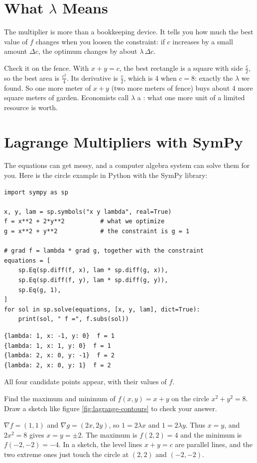 \section{What $\lambda$ Means}
The multiplier is more than a bookkeeping device. It tells you how much the best value
of $f$ changes when you loosen the constraint: if $c$ increases by a small amount
$\Delta c$, the optimum changes by about $\lambda\,\Delta c$.

Check it on the fence. With $x + y = c$, the best rectangle is a square with side
$\frac{c}{2}$, so the best area is $\frac{c^2}{4}$. Its derivative is $\frac{c}{2}$, which is 4
when $c = 8$: exactly the $\lambda$ we found. So one more meter of $x + y$ (two more
meters of fence) buys about 4 more square meters of garden. Economists call $\lambda$ a
: what one more unit of a limited resource is worth.

\section{Lagrange Multipliers with SymPy}
The equations can get messy, and a computer algebra system can solve them for you. Here
is the circle example in Python with the SymPy library:
\begin{verbatim}
import sympy as sp

x, y, lam = sp.symbols("x y lambda", real=True)
f = x**2 + 2*y**2          # what we optimize
g = x**2 + y**2            # the constraint is g = 1

# grad f = lambda * grad g, together with the constraint
equations = [
    sp.Eq(sp.diff(f, x), lam * sp.diff(g, x)),
    sp.Eq(sp.diff(f, y), lam * sp.diff(g, y)),
    sp.Eq(g, 1),
]
for sol in sp.solve(equations, [x, y, lam], dict=True):
    print(sol, " f =", f.subs(sol))
\end{verbatim}
\begin{verbatim}
{lambda: 1, x: -1, y: 0}  f = 1
{lambda: 1, x: 1, y: 0}  f = 1
{lambda: 2, x: 0, y: -1}  f = 2
{lambda: 2, x: 0, y: 1}  f = 2
\end{verbatim}
All four candidate points appear, with their values of $f$.

\begin{Exercise}[title={On a Circle}, label=lm_circle]
Find the maximum and minimum of $f(x, y) = x + y$ on the circle $x^2 + y^2 = 8$. Draw a
sketch like figure \ref{fig:lagrange-contours} to check your answer.
\end{Exercise}
\begin{Answer}[ref=lm_circle]
$\nabla f = (1, 1)$ and $\nabla g = (2x, 2y)$, so $1 = 2\lambda x$ and $1 = 2\lambda y$. Thus
$x = y$, and $2x^2 = 8$ gives $x = y = \pm 2$. The maximum is $f(2, 2) = 4$ and the minimum
is $f(-2, -2) = -4$. In a sketch, the level lines $x + y = c$ are parallel lines, and the
two extreme ones just touch the circle at $(2, 2)$ and $(-2, -2)$.
\end{Answer}

